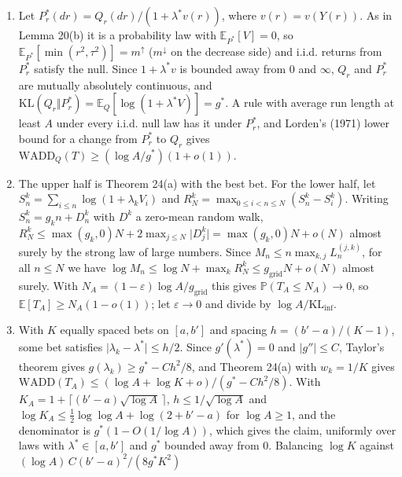 \documentclass[
]{article}
\begin{document}
\begin{enumerate}
\def\labelenumi{(\alph{enumi})}
\item
  Let \(P_r^\ast(dr) = Q_r(dr)/(1 + \lambda^\ast v(r))\), where
  \(v(r) = v(Y(r))\). As in Lemma 20(b) it is a probability law with
  \(\mathbb{E}_{P^\ast}[V] = 0\), so
  \(\mathbb{E}_{P^\ast}[\min(r^2, \tau^2)] = m^{\uparrow}\)
  (\(m^{\downarrow}\) on the decrease side) and i.i.d. returns from
  \(P_r^\ast\) satisfy the null. Since \(1 + \lambda^\ast v\) is bounded
  away from 0 and \(\infty\), \(Q_r\) and \(P_r^\ast\) are mutually
  absolutely continuous, and
  \(\mathrm{KL}(Q_r \Vert P_r^\ast) = \mathbb{E}_Q[\log(1 + \lambda^\ast V)] = g^\ast\).
  A rule with average run length at least \(A\) under every i.i.d. null
  law has it under \(P_r^\ast\), and Lorden's (1971) lower bound for a
  change from \(P_r^\ast\) to \(Q_r\) gives
  \(\mathrm{WADD}_Q(T) \ge (\log A/g^\ast)(1 + o(1))\).
\item
  The upper half is Theorem 24(a) with the best bet. For the lower half,
  let \(S_n^k = \sum_{i \le n}\log(1 + \lambda_k V_i)\) and
  \(R_N^k = \max_{0 \le i < n \le N}(S_n^k - S_i^k)\). Writing
  \(S_n^k = g_k n + D_n^k\) with \(D^k\) a zero-mean random walk,
  \(R_N^k \le \max(g_k, 0)N + 2\max_{j \le N}\lvert D_j^k\rvert = \max(g_k, 0)N + o(N)\)
  almost surely by the strong law of large numbers. Since
  \(M_n \le n\max_{k, j}L_n^{(j,k)}\), for all \(n \le N\) we have
  \(\log M_n \le \log N + \max_k R_N^k \le g_{\mathrm{grid}}N + o(N)\)
  almost surely. With
  \(N_A = (1 - \varepsilon)\log A/g_{\mathrm{grid}}\) this gives
  \(\mathbb{P}(T_A \le N_A) \to 0\), so
  \(\mathbb{E}[T_A] \ge N_A(1 - o(1))\); let \(\varepsilon \to 0\) and
  divide by \(\log A/\mathrm{KL}_{\inf}\).
\item
  With \(K\) equally spaced bets on \([a, b']\) and spacing
  \(h = (b' - a)/(K - 1)\), some bet satisfies
  \(\lvert \lambda_k - \lambda^\ast\rvert \le h/2\). Since
  \(g'(\lambda^\ast) = 0\) and \(\lvert g''\rvert \le C\), Taylor's
  theorem gives \(g(\lambda_k) \ge g^\ast - Ch^2/8\), and Theorem 24(a)
  with \(w_k = 1/K\) gives
  \(\mathrm{WADD}(T_A) \le (\log A + \log K + o)/(g^\ast - Ch^2/8)\).
  With \(K_A = 1 + \lceil (b' - a)\sqrt{\log A}\,\rceil\),
  \(h \le 1/\sqrt{\log A}\) and
  \(\log K_A \le \tfrac12\log\log A + \log(2 + b' - a)\) for
  \(\log A \ge 1\), and the denominator is \(g^\ast(1 - O(1/\log A))\),
  which gives the claim, uniformly over laws with
  \(\lambda^\ast \in [a, b']\) and \(g^\ast\) bounded away from 0.
  Balancing \(\log K\) against \((\log A)\,C(b' - a)^2/(8g^\ast K^2)\)

\end{enumerate}
\end{document}

